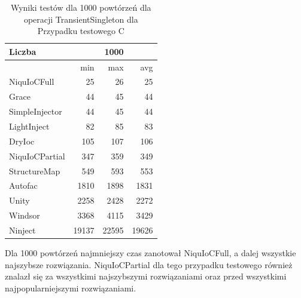 \documentclass[12pt]{article}
\begin{document}
\begin{table}[H]
\captionsetup{belowskip=0pt,aboveskip=0pt}
\begin{center}
\begin{small}
	\begin{tabular}{ | l | r r r | }
    		\hline
Liczba & & 1000 & \\ \hline
 & min & max & avg \\ \hline
NiquIoCFull & 25 & 26 & 25 \\ \hline
Grace & 44 & 45 & 44 \\ \hline
SimpleInjector & 44 & 45 & 44 \\ \hline
LightInject & 82 & 85 & 83 \\ \hline
DryIoc & 105 & 107 & 106 \\ \hline
NiquIoCPartial & 347 & 359 & 349 \\ \hline
StructureMap & 549 & 593 & 553 \\ \hline
Autofac & 1810 & 1898 & 1831 \\ \hline
Unity & 2258 & 2428 & 2272 \\ \hline
Windsor & 3368 & 4115 & 3429 \\ \hline
Ninject & 19137 & 22595 & 19626 \\ \hline
  	\end{tabular}
\end{small}
\end{center}
\caption{Wyniki testów dla 1000 powtórzeń dla operacji TransientSingleton dla Przypadku testowego C}
\label{TestCaseC_TransientSingleton1000}
\end{table}
Dla 1000 powtórzeń najmniejszy czas zanotował NiquIoCFull, a dalej wszystkie najszybsze rozwiązania. NiquIoCPartial dla tego przypadku testowego również znalazł się za wszystkimi najszybszymi rozwiązaniami oraz przed wszystkimi najpopularniejszymi rozwiązaniami.
\end{document}
